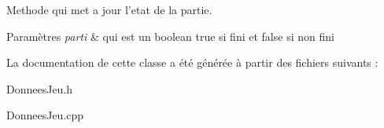 \-Methode qui met a jour l'etat de la partie. 


\begin{DoxyParams}{\-Paramètres}
{\em parti} & qui est un boolean true si fini et false si non fini \\
\hline
\end{DoxyParams}


\-La documentation de cette classe a été générée à partir des fichiers suivants \-:\begin{DoxyCompactItemize}
\item 
\-Donnees\-Jeu.\-h\item 
\-Donnees\-Jeu.\-cpp\end{DoxyCompactItemize}
